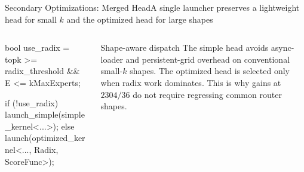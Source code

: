\documentclass[aspectratio=169,10pt]{beamer}
\renewcommand{\NvidiaSource}[1]{}
\begin{document}
\begin{frame}[fragile]{Secondary Optimizations: Merged Head}{A single launcher preserves a lightweight head for small $k$ and the optimized head for large shapes}
  \NvidiaSource{TE commit \texttt{9cfb651a};
    \texttt{TE/.../fused\_router/fused\_topk\_with\_score\_function.cu}}
  \begin{columns}[T,onlytextwidth]
    \begin{column}{.58\textwidth}
      \begin{NvidiaCode}[language=NvidiaCUDA,basicstyle=\ttfamily\fontsize{6.6}{7.8}\selectfont]
bool use_radix = topk >= radix_threshold && E <= kMaxExperts;

if (!use_radix)
  launch_simple(simple_kernel<...>);
else
  launch(optimized_kernel<..., Radix, ScoreFunc>);
      \end{NvidiaCode}
    \end{column}
    \begin{column}{.37\textwidth}
      {\NvidiaSansMedium Shape-aware dispatch}\NvidiaTightRule{.6pt}\vspace{.07in}
      \small The simple head avoids async-loader and persistent-grid overhead on conventional
      small-$k$ shapes. The optimized head is selected only when radix work dominates.
      \vspace{.10in}
      \small This is why gains at $2304/36$ do not require regressing common router shapes.
    \end{column}
  \end{columns}
\end{frame}
\end{document}
